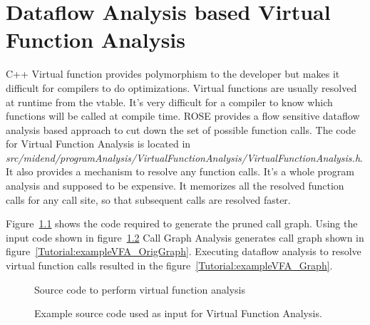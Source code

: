\chapter{Dataflow Analysis based Virtual Function Analysis}

C++ Virtual function provides polymorphism to the developer but makes it difficult for compilers to do optimizations. 
Virtual functions are usually resolved at runtime from the vtable.
It's very difficult for a compiler to know which functions will be called at compile time.
ROSE provides a flow sensitive dataflow analysis based approach to cut down the set of possible function calls. 
The code for Virtual Function Analysis is located in \textit{src/midend/programAnalysis/VirtualFunctionAnalysis/VirtualFunctionAnalysis.h}. 
It also
provides a mechanism to resolve any function calls. It's a whole program analysis and supposed to be expensive.
It memorizes all the resolved function calls for any call site, so that subsequent calls are resolved  faster.

Figure~\ref{Tutorial:exampleVFA} shows the code required to generate
the pruned call graph.  Using the input code shown in
figure~\ref{Tutorial:exampleInputCode_VFA} Call Graph Analysis generates call graph shown in figure~\ref{Tutorial:exampleVFA_OrigGraph}.
Executing dataflow analysis to resolve virtual function calls resulted in the 
 figure~\ref{Tutorial:exampleVFA_Graph}.

\begin{figure}[!h]
{\indent
{\mySmallFontSize


\begin{latexonly}
   
\end{latexonly}

\begin{htmlonly}
   
\end{htmlonly}

}
}
\caption{Source code to perform virtual function analysis}
\label{Tutorial:exampleVFA}
\end{figure}


\begin{figure}[!h]
{\indent
{\mySmallFontSize


\begin{latexonly}
   
\end{latexonly}

\begin{htmlonly}
   
\end{htmlonly}

}
}
\label{Tutorial:exampleInputCode_VFA}
\caption{Example source code used as input for Virtual Function Analysis.}
\end{figure}

